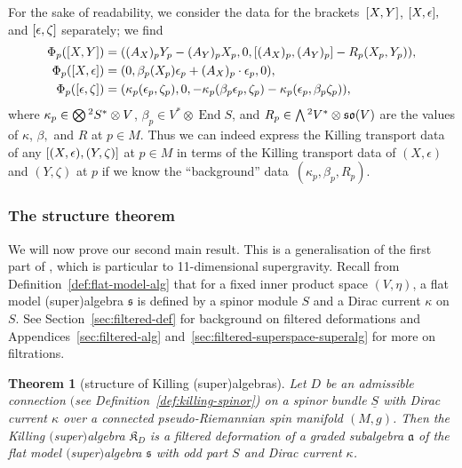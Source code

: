 \documentclass[11pt]{article}
\numberwithin{equation}{section}
\numberwithin{equation}{section}
\newtheorem{Theorem}{Theorem}[section]
\newcommand{\fa}{\mathfrak{a}}
\newcommand{\fs}{\mathfrak{s}}
\newcommand{\fso}{\mathfrak{so}}
\newcommand{\fK}{\mathfrak{K}}
\newcommand{\Sbundle}{\underline{S}}
\newcommand{\Wedge}{\mathchoice{{\textstyle\bigwedge}}{\bigwedge}{\bigwedge}{\bigwedge}}	%
\newcommand{\Otimes}{\mathchoice{{\textstyle\bigotimes}}{\bigotimes}{\bigotimes}{\bigotimes}}
\newcommand{\1}{\mathbbm{1}}
\DeclareMathOperator{\End}{End}
\begin{document}
For the sake of readability, we consider the data for the brackets~$\comm{X}{Y}$, $\comm{X}{\epsilon},$ and $\comm{\epsilon}{\zeta}$ separately; we find
\begin{align}
	\Phi_p(\comm{X}{Y})
		&= ((A_X)_p Y_p - (A_Y)_p X_p,0,\comm{(A_X)_p}{(A_Y)_p} - R_p(X_p,Y_p)),
		\label{eq:phi-p-XY}\\
	\Phi_p(\comm{X}{\epsilon})
		&= (0,\beta_p(X_p)\epsilon_p + (A_X)_p\cdot\epsilon_p,0),
		\label{eq:phi-p-Xepsilon}\\
	\Phi_p(\comm{\epsilon}{\zeta})
		&= (\kappa_p(\epsilon_p,\zeta_p),0,- \kappa_p(\beta_p\epsilon_p,\zeta_p) - \kappa_p(\epsilon_p,\beta_p\zeta_p)),
		\label{eq:phi-p-epsilonzeta}
\end{align}
where $\kappa_p\in\Otimes^2S^*\otimes V$, $\beta_p\in V^*\otimes\End S$, and $R_p\in\Wedge^2V^*\otimes \fso(V)$ are the values of $\kappa$, $\beta,$ and $R$ at $p\in M$. Thus we can indeed express the Killing transport data of any $\comm{(X,\epsilon)}{(Y,\zeta)}$ at $p\in M$ in terms of the Killing transport data of $(X,\epsilon)$ and $(Y,\zeta)$ at $p$ if we know the ``background'' data~$(\kappa_p,\beta_p,R_p)$.

\subsubsection{The structure theorem}

We will now prove our second main result. This is a generalisation of the first part of \cite[Theorem~12]{Figueroa-OFarrill2017_1}, which is particular to 11-dimensional supergravity. Recall from Definition~\ref{def:flat-model-alg} that for a fixed inner product space $(V,\eta)$, a flat model (super)algebra $\fs$ is defined by a spinor module $S$ and a Dirac current $\kappa$ on $S$. See Section~\ref{sec:filtered-def} for background on filtered deformations and Appendices~\ref{sec:filtered-alg} and~\ref{sec:filtered-superspace-superalg} for more on filtrations.

\begin{Theorem}[structure of Killing (super)algebras]\label{thm:killing-algebra-filtered}
	Let $D$ be an admissible connection $($see Definition~{\rm\ref{def:killing-spinor})} on a spinor bundle $\Sbundle$ with Dirac current $\kappa$ over a connected pseudo-Riemannian spin manifold $(M,g)$. Then the Killing $($super$)$algebra $\fK_D$ is a filtered deformation of a graded subalgebra $\fa$ of the flat model $($super$)$algebra $\fs$ with odd part $S$ and Dirac current $\kappa$.
\end{Theorem}
\end{document}
